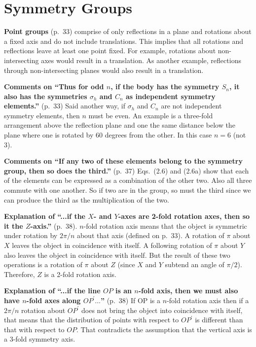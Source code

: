 \chapter{Symmetry Groups}

{\bf Point groups} (p.\ 33) comprise of only reflections in a plane and
rotations about a fixed axis and do not include translations. This
implies that all rotations and reflections leave at least one point
fixed. For example, rotations about non-intersecting axes would result
in a translation. As another example, reflections through
non-intersecting planes would also result in a translation.

{\bf Comments on ``Thus for odd $n$, if the body has the symmetry
  $S_n$, it also has the symmetries $\sigma_h$ and $C_n$ as
  independent symmetry elements.''} (p.\ 33) Said another way, if
$\sigma_h$ and $C_n$ are not independent symmetry elements, then $n$
must be even. An example is a three-fold arrangement above the
reflection plane and one the same distance below the plane where one
is rotated by 60 degrees from the other. In this case $n = 6$ (not 3).

{\bf Comments on ``If any two of these elements belong to the symmetry
  group, then so does the third.''} (p.\ 37) Eqs.\ (2.6) and (2.6a)
show that each of the elements can be expressed as a combination of
the other two. Also all three commute with one another. So if two are
in the group, so must the third since we can produce the third as the
multiplication of the two.

{\bf Explanation of ``...if the $X$- and $Y$-axes are 2-fold rotation
  axes, then so it the $Z$-axis.''} (p.\ 38). $n$-fold rotation axis
means that the object is symmetric under rotation by $2\pi/n$ about
that axis (defined on p.\ 33).  A rotation of $\pi$ about $X$ leaves
the object in coincidence with itself. A following rotation of $\pi$
about $Y$ also leaves the object in coincidence with itself. But the
result of these two operations is a rotation of $\pi$ about $Z$ (since
$X$ and $Y$ subtend an angle of $\pi/2$). Therefore, $Z$ is a 2-fold
rotation axis.

{\bf Explanation of ``...if the line $OP$ is an $n$-fold axis, then we
  must also have $n$-fold axes along $OP^\prime...$''} (p.\ 38) If OP
is a $n$-fold rotation axis then if a $2\pi/n$ rotation about $OP^\prime$
does not bring the object into coincidence with itself, that means
that the distribution of points with respect to $OP^\prime$ is
different than that with respect to $OP$. That contradicts the
assumption that the vertical axis is a 3-fold symmetry axis.

